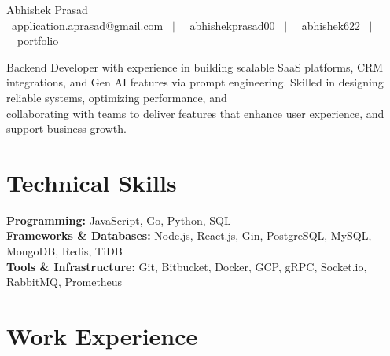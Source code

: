\documentclass[a4paper,12pt]{article}
\begin{document}
\pagestyle{empty} 

\begin{center}
{\Huge{Abhishek Prasad}} \\[4pt]
\href{mailto:application.aprasad@gmail.com}{\raisebox{-0.05\height}\faEnvelope\ application.aprasad@gmail.com} \ $|$ \
\href{https://linkedin.com/in/abhishekprasad00}{\raisebox{-0.05\height}\faLinkedin\ abhishekprasad00} \ $|$ \
\href{https://github.com/abhishek622}{\raisebox{-0.05\height}\faGithub\ abhishek622} \ $|$ \
\href{https://portfolio.abhishekprasad0602.workers.dev}{\raisebox{-0.05\height}\faGlobe\ portfolio}
\end{center}


Backend Developer with experience in building scalable SaaS platforms, CRM integrations, and Gen AI features via prompt engineering. Skilled in designing reliable systems, optimizing performance, and\\collaborating with teams to deliver features that enhance user experience, and support business growth.

\section{Technical Skills}
\textbf{Programming:} JavaScript, Go, Python, SQL \\
\textbf{Frameworks \& Databases:} Node.js, React.js, Gin, PostgreSQL, MySQL, MongoDB, Redis, TiDB \\
\textbf{Tools \& Infrastructure:} Git, Bitbucket, Docker, GCP, gRPC, Socket.io, RabbitMQ, Prometheus



\section{Work Experience}
\end{document}
